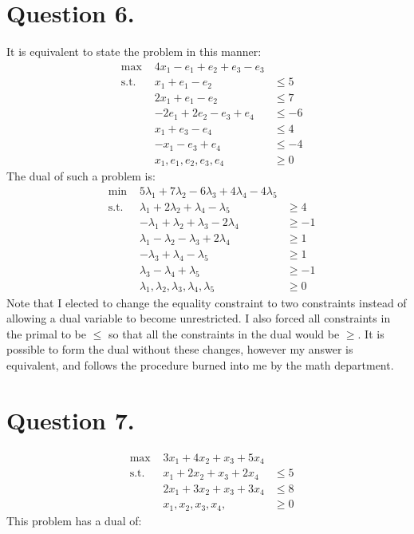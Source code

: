 \documentclass[10pt, letterpaper]{paper}
\begin{document}
\section*{Question 6.}
It is equivalent to state the problem in this manner:
\begin{equation*}
\begin{alignedat}{3}
&\text{max }&4x_1 - e_1 + e_2 + e_3 - e_3&\\
&\text{s.t. } &x_1 + e_1 - e_2 &\leq 5\\
& &2x_1 + e_1 - e_2 &\leq 7\\
& &-2e_1 + 2e_2 - e_3 + e_4 &\leq -6\\
& &x_1 + e_3 - e_4 &\leq 4\\
& &-x_1 -e_3 + e_4 &\leq -4\\
& &x_1, e_1, e_2, e_3, e_4 &\geq 0
\end{alignedat}
\end{equation*}
The dual of such a problem is:
\begin{equation*}
\begin{alignedat}{3}
&\text{min }&5\lambda_1 + 7\lambda_2 - 6\lambda_3 + 4\lambda_4 -4\lambda_5&\\
&\text{s.t. } &\lambda_1 + 2\lambda_2 + \lambda_4 -\lambda_5 &\geq 4\\
& &-\lambda_1 + \lambda_2 + \lambda_3 - 2\lambda_4 &\geq -1\\
& &\lambda_1 - \lambda_2 - \lambda_3 + 2\lambda_4 &\geq 1\\
& &-\lambda_3 + \lambda_4 - \lambda_5 &\geq 1\\
& &\lambda_3 - \lambda_4 + \lambda_5 &\geq -1\\
& &\lambda_1, \lambda_2, \lambda_3, \lambda_4, \lambda_5 &\geq 0
\end{alignedat}
\end{equation*}
Note that I elected to change the equality constraint to two constraints instead of allowing a dual variable to become unrestricted. I also forced all constraints in the primal to be $\leq$ so that all the constraints in the dual would be $\geq$. It is possible to form the dual without these changes, however my answer is equivalent, and follows the procedure burned into me by the math department. 



\section*{Question 7.}

\begin{equation*}
\begin{alignedat}{3}
&\text{max }&3x_1 + 4x_2 + x_3 + 5x_4&\\
&\text{s.t. } &x_1 + 2x_2 + x_3 + 2x_4 &\leq 5\\
& &2x_1 + 3x_2 + x_3 + 3x_4 &\leq 8\\
& &x_1, x_2, x_3, x_4, &\geq 0
\end{alignedat}
\end{equation*}
This problem has a dual of: 
\end{document}
